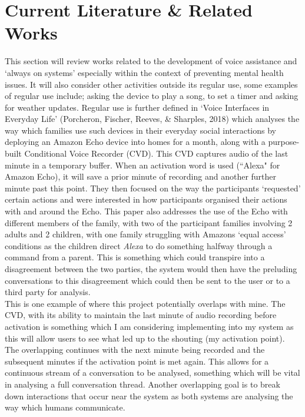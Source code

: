 \documentclass[a4paper,11pt]{report}
\begin{document}
\section{Current Literature \& Related Works}
This section will review works related to the development of voice assistance and ‘always on systems’ especially within the context of preventing mental health issues. It will also consider other activities outside its regular use, some examples of regular use include; asking the device to play a song, to set a timer and asking for weather updates. Regular use is further defined in ‘Voice Interfaces in Everyday Life’ (Porcheron, Fischer, Reeves, \& Sharples, 2018) which analyses the way which families use such devices in their everyday social interactions by deploying an Amazon Echo device into homes for a month, along with a purpose-built Conditional Voice Recorder (CVD). This CVD captures audio of the last minute in a temporary buffer. When an activation word is used (“Alexa" for Amazon Echo), it will save a prior minute of recording and another further minute past this point. They then focused on the way the participants ‘requested’ certain actions and were interested in how participants organised their actions with and around the Echo. This paper also addresses the use of the Echo with different members of the family, with two of the participant families involving 2 adults and 2 children, with one family struggling with Amazons ‘equal access’ conditions as the children direct \textit{Alexa} to do something halfway through a command from a parent. This is something which could transpire into a disagreement between the two parties, the system would then have the preluding conversations to this disagreement which could then be sent to the user or to a third party for analysis. \\

This is one example of where this project potentially overlaps with mine. The CVD, with its ability to maintain the last minute of audio recording before activation is something which I am considering implementing into my system as this will allow users to see what led up to the shouting (my activation point). The overlapping continues with the next minute being recorded and the subsequent minutes if the activation point is met again. This allows for a continuous stream of a conversation to be analysed, something which will be vital in analysing a full conversation thread. Another overlapping goal is to break down interactions that occur near the system as both systems are analysing the way which humans communicate.\\
\end{document}
